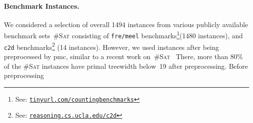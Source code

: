 \documentclass{llncs}
\newcommand{\cSAT}{\textsc{\#Sat}\xspace}%
\newcommand{\WMC}{\textsc{WMC}\xspace}%
\newcommand{\instances}[1]{\texttt{#1}}
\begin{document}
\paragraph{Benchmark Instances.}
We considered a selection of overall 1494 instances from various
publicly available benchmark sets~\cSAT consisting of %
%
%
%
%
\instances{fre/meel} benchmarks\footnote{See:
  \href{http://tinyurl.com/countingbenchmarks}{\nolinkurl{tinyurl.com/countingbenchmarks}}}(1480
instances), %
and \instances{c2d} benchmarks\footnote{See:
  \href{http://reasoning.cs.ucla.edu/c2d/results.html}{\nolinkurl{reasoning.cs.ucla.edu/c2d}}}
(14 instances).
However, we used instances after being preprocessed by pmc,
similar to a recent work on~\cSAT~\cite{FichteEtAl19}
There, more than 80\% of the \cSAT instances have primal treewidth below~19
after preprocessing.
Before preprocessing
%
%
%
%
\end{document}
